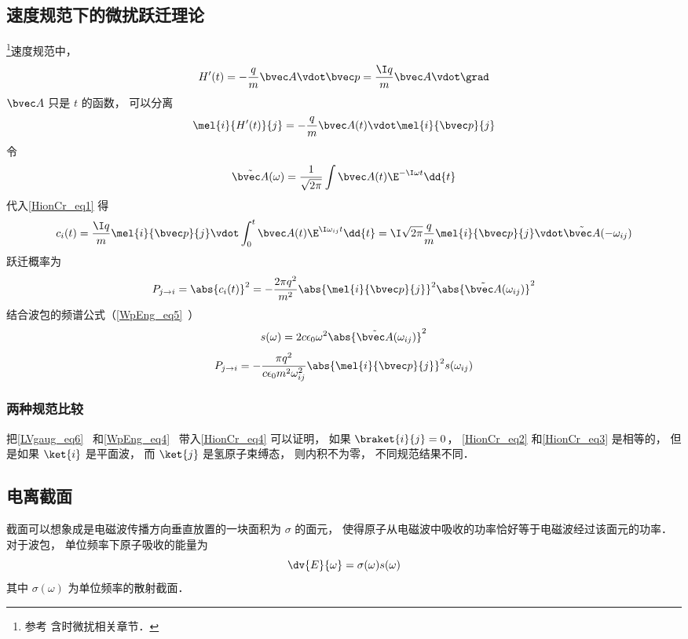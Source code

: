 \subsection{速度规范下的微扰跃迁理论}
\footnote{参考\cite{Merzbacher} 含时微扰相关章节．}速度规范中，
\begin{equation}
H'(t) = -\frac{q}{m}\bvec A \vdot \bvec p = \frac{\I q}{m}\bvec A \vdot \grad
\end{equation}
$\bvec A$ 只是 $t$ 的函数， 可以分离
\begin{equation}
\mel{i}{H'(t)}{j} = -\frac{q}{m}\bvec A(t) \vdot \mel{i}{\bvec p}{j}
\end{equation}
令
\begin{equation}
\tilde {\bvec A}(\omega) = \frac{1}{\sqrt{2\pi}} \int \bvec A(t) \E^{-\I\omega t} \dd{t}
\end{equation}
代入\autoref{HionCr_eq1} 得
\begin{equation}\label{HionCr_eq4}
c_i(t) = \frac{\I q}{m} \mel{i}{\bvec p}{j} \vdot \int_0^t  \bvec A(t) \E^{\I\omega_{ij} t} \dd{t} = \I\sqrt{2\pi}\frac{q}{m} \mel{i}{\bvec p}{j} \vdot \tilde {\bvec A}(-\omega_{ij})
\end{equation}
跃迁概率为
\begin{equation}\label{HionCr_eq3}
P_{j\to i} = \abs{c_i(t)}^2 = -\frac{2\pi q^2}{m^2} \abs{\mel{i}{\bvec p}{j}}^2 \abs{\tilde {\bvec A}(\omega_{ij})}^2
\end{equation}
结合波包的频谱公式（\autoref{WpEng_eq5}~）
\begin{equation}
s(\omega) = 2c\epsilon_0 \omega^2 \abs{\tilde {\bvec A}(\omega_{ij})}^2
\end{equation}
\begin{equation}
P_{j\to i} = -\frac{\pi q^2}{c\epsilon_0 m^2 \omega_{ij}^2} \abs{\mel{i}{\bvec p}{j}}^2 s(\omega_{ij})
\end{equation}

\subsubsection{两种规范比较}
把\autoref{LVgaug_eq6}~ 和\autoref{WpEng_eq4}~ 带入\autoref{HionCr_eq4} 可以证明， 如果 $\braket{i}{j} = 0$， \autoref{HionCr_eq2} 和\autoref{HionCr_eq3} 是相等的， 但是如果 $\ket{i}$ 是平面波， 而 $\ket{j}$ 是氢原子束缚态， 则内积不为零， 不同规范结果不同．

\subsection{电离截面}
截面可以想象成是电磁波传播方向垂直放置的一块面积为 $\sigma$ 的面元， 使得原子从电磁波中吸收的功率恰好等于电磁波经过该面元的功率． 对于波包， 单位频率下原子吸收的能量为
\begin{equation}
\dv{E}{\omega} = \sigma(\omega) s(\omega)
\end{equation}
其中 $\sigma(\omega)$ 为单位频率的散射截面．
